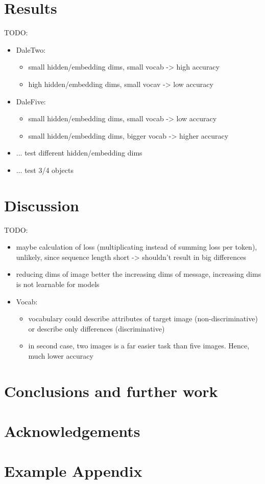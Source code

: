 \documentclass[11pt]{article}
\begin{document}
\section{Results}
TODO:
\begin{itemize}
  \item DaleTwo:
        \begin{itemize}
          \item small hidden/embedding dims, small vocab -> high accuracy
          \item high hidden/embedding dims, small vocav -> low accuracy
        \end{itemize}
  \item DaleFive:
        \begin{itemize}
          \item small hidden/embedding dims, small vocab -> low accuracy
          \item small hidden/embedding dims, bigger vocab -> higher accuracy
        \end{itemize}
  \item ... test different hidden/embedding dims
  \item ... test 3/4 objects
\end{itemize}

\section{Discussion}
TODO:
\begin{itemize}
  \item maybe calculation of loss (multiplicating instead of summing loss per token), unlikely, since sequence length short -> shouldn't result in big differences
  \item reducing dims of image better the increasing dims of message, increasing dims is not learnable for models
  \item Vocab:
        \begin{itemize}
          \item vocabulary could describe attributes of target image (non-discriminative) or describe only differences (discriminative)
          \item in second case, two images is a far easier task than five images. Hence, much lower accuracy
        \end{itemize}
\end{itemize}

\section{Conclusions and further work}

\section*{Acknowledgements}

%

\appendix

\section{Example Appendix}
\end{document}
